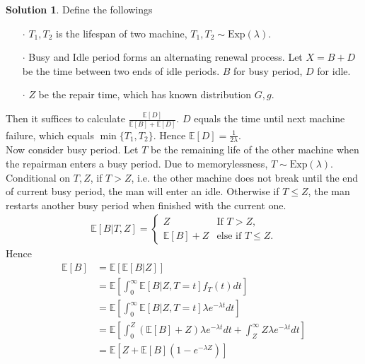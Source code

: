 \documentclass[a4paper, 10pt]{article}
\theoremstyle{definition}
\theoremstyle{hSol}
\newtheorem*{solution}{Solution}
\begin{document}
\begin{solution} Define the followings
\begin{itemize}
  \item[$\cdot$] $T_1, T_2$ is the lifespan of two machine, $T_1, T_2\sim \text{Exp}(\lambda)$.
  \item[$\cdot$] Busy and Idle period forms an alternating renewal process. Let $X=B+D$ be the time between two ends of idle periods. $B$ for busy period, $D$ for idle. 
  \item[$\cdot$] $Z$ be the repair time, which has known distribution $G, g$.
\end{itemize}
Then it suffices to calculate $\frac{\mathbb{E}\left[D\right]}{\mathbb{E}\left[B\right]+\mathbb{E}\left[D\right]}$. $D$ equals the time until next machine failure, which equals $\min\{T_1,T_2\}$. Hence $\mathbb{E}\left[D\right]=\frac{1}{2 \lambda}$. \\
Now consider busy period. Let $T$ be the remaining life of the other machine when the repairman enters a busy period. Due to memorylessness, $T\sim \text{Exp}(\lambda)$. Conditional on $T,Z$, if $T>Z$, i.e. the other machine does not break until the end of current busy period, the man will enter an idle. Otherwise if $T\leq Z$, the man restarts another busy period when finished with the current one.
\begin{equation}
  \begin{split}
    \mathbb{E}\left[B|T,Z\right] = 
    \begin{cases}
      Z & \text{If $T>Z$,} \\
      \mathbb{E}\left[B\right] + Z & \text{else if $T\leq Z$.}
    \end{cases}
  \end{split}
\end{equation}
Hence
\begin{equation}
  \begin{split}
    \mathbb{E}\left[B\right] &= \mathbb{E}\left[\mathbb{E}\left[B|Z\right]\right] \\
    &= \mathbb{E}\left[\int_0^{\infty} \mathbb{E}\left[B|Z,T=t\right] f_T(t)dt\right] \\
    &= \mathbb{E}\left[\int_0^{\infty} \mathbb{E}\left[B|Z,T=t\right] \lambda e^{-\lambda t}dt\right]\\
    &= \mathbb{E}\left[\int_0^{Z} (\mathbb{E}\left[B\right]+Z) \lambda e^{-\lambda t}dt + \int_Z^{\infty} Z \lambda e^{-\lambda t}dt\right]\\
    &= \mathbb{E}\left[Z + \mathbb{E}\left[B\right](1-e^{-\lambda Z})\right]\\

\end{split}
\end{equation}
\end{solution}
\end{document}
